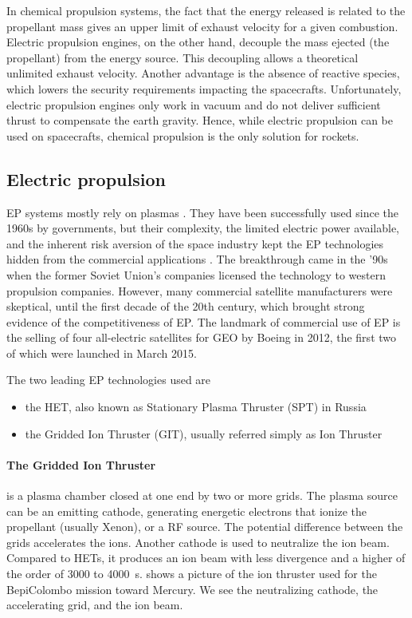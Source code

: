 In chemical propulsion systems, the fact that the energy released is related to the propellant mass gives an upper limit of exhaust velocity for a given combustion.
Electric propulsion engines, on the other hand, decouple the mass ejected (the propellant) from the energy source.
This decoupling allows a theoretical unlimited exhaust velocity.
Another advantage is the absence of reactive species, which lowers the security requirements impacting the spacecrafts.
Unfortunately, electric propulsion engines only work in vacuum and do not deliver sufficient thrust to compensate the earth gravity.
Hence, while electric propulsion can be used on spacecrafts, chemical propulsion is the only solution for rockets.

\subsection{Electric propulsion} \label{subsec-EP}
\ac{EP} systems mostly rely on plasmas \citep{charles2009,mazouffre2016}.
They have been successfully used since the 1960s by governments, but their complexity, the limited electric power available, and the inherent risk aversion of the space industry kept the \ac{EP} technologies hidden from the commercial applications \citep{lev2019}.
The breakthrough came in the '90s when the former Soviet Union's companies licensed the technology to western propulsion companies.
However, many commercial satellite manufacturers were skeptical, until the first decade of the 20th century, which brought strong evidence of the competitiveness of \ac{EP}.
The landmark of commercial use of \ac{EP} is the selling of four all-electric satellites for \ac{GEO} by Boeing in 2012, the first two of which were launched in March 2015.

The two leading \ac{EP} technologies used are
\begin{itemize}
  \item the \ac{HET}, also known as Stationary Plasma Thruster (SPT) in Russia
  \item the Gridded Ion Thruster (GIT), usually referred simply as Ion Thruster
\end{itemize}




 
 \paragraph{The Gridded Ion Thruster} is a plasma chamber closed at one end by two or more grids.
 The plasma source can be an emitting cathode, generating energetic electrons that ionize the propellant (usually Xenon), or a \ac{RF} source.
 The potential difference between the grids accelerates the ions.
 Another cathode is used to neutralize the ion beam.
 Compared to \ac{HET}s, it produces an ion beam with less divergence and a higher \Isp of the order of 3000 to 4000~s.
  shows a picture of the ion thruster used for the BepiColombo mission toward Mercury.
 We see the neutralizing cathode, the accelerating grid, and the ion beam.
 
